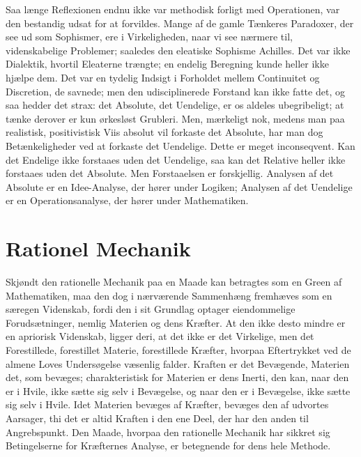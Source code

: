 \documentclass[12pt]{book}
\newcommand{\apage}[1]{\marginnote{\footnotesize\textit{[#1]}}}
\begin{document}
Saa længe Reflexionen endnu ikke var methodisk forligt med Operationen, var
den bestandig udsat for at forvildes. Mange af de gamle Tænkeres Paradoxer,
der see ud som Sophismer, ere i Virkeligheden, naar vi see nærmere til,
videnskabelige Problemer; saaledes den eleatiske Sophisme Achilles. Det var
ikke Dialektik, hvortil Eleaterne trængte; en endelig Beregning kunde
heller ikke hjælpe dem. Det var en tydelig Indsigt i Forholdet mellem
Continuitet og Discretion, de savnede; men den udisciplinerede Forstand
kan ikke fatte det, og saa hedder det strax: det Absolute, det Uendelige,
er os aldeles ubegribeligt; at tænke derover er kun ørkesløst Grubleri.
Men, mærkeligt nok, medens man paa realistisk, positivistisk Viis \apage{125} absolut
vil forkaste det Absolute, har man dog Betænkeligheder ved at forkaste det
Uendelige. Dette er meget inconseqvent. Kan det Endelige ikke forstaaes
uden det Uendelige, saa kan det Relative heller ikke forstaaes uden det
Absolute. Men Forstaaelsen er forskjellig. Analysen af det Absolute er en
Idee-Analyse, der hører under Logiken; Analysen af det Uendelige er en
Operationsanalyse, der hører under Mathematiken.

\section{Rationel Mechanik}
\label{sec:13}

\noindent Skjøndt den rationelle Mechanik paa en Maade kan betragtes som
en Green af Mathematiken, maa den dog i nærværende Sammenhæng fremhæves som
en særegen Videnskab, fordi den i sit Grundlag optager eiendommelige
Forudsætninger, nemlig Materien og dens Kræfter. At den ikke desto mindre
er en apriorisk Videnskab, ligger deri, at det ikke er det Virkelige, men
det Forestillede, forestillet Materie, forestillede Kræfter, hvorpaa
Eftertrykket ved de almene Loves Undersøgelse væsenlig falder. Kraften er
det Bevægende, Materien det, som bevæges; charakteristisk for Materien er
dens Inerti, den kan, naar den er i Hvile, ikke sætte sig selv i Bevægelse,
og naar den er i Bevægelse, ikke sætte sig selv i Hvile. Idet Materien
bevæges af Kræfter, bevæges den af udvortes Aarsager, thi det er altid
Kraften i den ene Deel, der har den anden til Angrebspunkt. Den Maade,
hvorpaa den rationelle Mechanik har sikkret sig Betingelserne \apage{126} for
Kræfternes Analyse, er betegnende for dens hele Methode.
\end{document}
